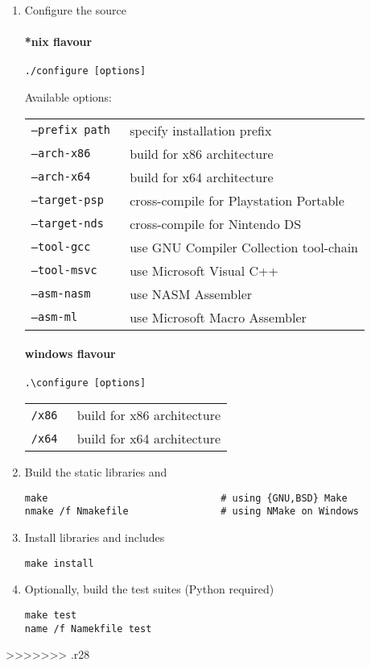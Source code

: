 \begin{enumerate}
\item Configure the source

\paragraph{*nix flavour}
\begin{lstlisting}
./configure [options]
\end{lstlisting}

Available options:

\begin{tabular}{ll}
{\tt --prefix path } & specify installation prefix \\
{\tt --arch-x86 } & build for x86 architecture \\
{\tt --arch-x64 } & build for x64 architecture \\
{\tt --target-psp } & cross-compile for Playstation Portable \\
{\tt --target-nds } & cross-compile for Nintendo DS \\
{\tt --tool-gcc } & use GNU Compiler Collection tool-chain \\
{\tt --tool-msvc } & use Microsoft Visual C++ \\
{\tt --asm-nasm } & use NASM Assembler \\
{\tt --asm-ml } & use Microsoft Macro Assembler \\
\end{tabular}


\paragraph{windows flavour}

\begin{lstlisting}
.\configure [options]
\end{lstlisting}

\begin{tabular}{ll}
{\tt /x86 } & build for x86 architecture \\
{\tt /x64 } & build for x64 architecture \\
\end{tabular}

\item Build the static libraries  and 
\begin{lstlisting}
make                              # using {GNU,BSD} Make
nmake /f Nmakefile                # using NMake on Windows
\end{lstlisting}
\item Install libraries and includes
\begin{lstlisting}
make install 
\end{lstlisting}
\item Optionally, build the test suites (Python required)
\begin{lstlisting}
make test
name /f Namekfile test
\end{lstlisting}
\end{enumerate}

>>>>>>> .r28
